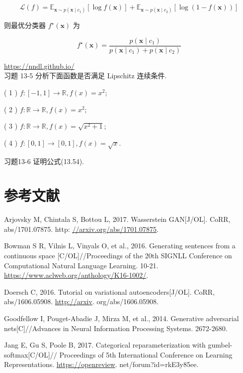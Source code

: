 \documentclass[10pt]{article}
\begin{document}
\begin{equation*}
\mathcal{L}(f)=\mathbb{E}_{\boldsymbol{x} \sim p\left(\boldsymbol{x} \mid c_{1}\right)}[\log f(\boldsymbol{x})]+\mathbb{E}_{\boldsymbol{x} \sim p\left(\boldsymbol{x} \mid c_{2}\right)}[\log (1-f(\boldsymbol{x}))] \tag{13.57}
\end{equation*}


则最优分类器 $f^{\star}(\boldsymbol{x})$ 为


\begin{equation*}
f^{\star}(\boldsymbol{x})=\frac{p\left(\boldsymbol{x} \mid c_{1}\right)}{p\left(\boldsymbol{x} \mid c_{1}\right)+p\left(\boldsymbol{x} \mid c_{2}\right)} \tag{13.58}
\end{equation*}


\href{https://nndl.github.io/}{https://nndl.github.io/}\\
习题 13-5 分析下面函数是否满足 Lipschitz 连续条件.

( 1 ) $f:[-1,1] \rightarrow \mathbb{R}, f(x)=x^{2}$;

( 2 ) $f: \mathbb{R} \rightarrow \mathbb{R}, f(x)=x^{2}$;

( 3 ) $f: \mathbb{R} \rightarrow \mathbb{R}, f(x)=\sqrt{x^{2}+1}$;

( 4 ) $f:[0,1] \rightarrow[0,1], f(x)=\sqrt{x}$.

习题13-6 证明公式(13.54).

\section*{参考文献}
Arjovsky M, Chintala S, Bottou L, 2017. Wasserstein GAN[J/OL]. CoRR, abs/1701.07875. http: \href{//arxiv.org/abs/1701.07875}{//arxiv.org/abs/1701.07875}.

Bowman S R, Vilnis L, Vinyals O, et al., 2016. Generating sentences from a continuous space [C/OL]//Proceedings of the 20th SIGNLL Conference on Computational Natural Language Learning. 10-21. \href{https://www.aclweb.org/anthology/K16-1002/}{https://www.aclweb.org/anthology/K16-1002/}.

Doersch C, 2016. Tutorial on variational autoencoders[J/OL]. CoRR, abs/1606.05908. \href{http://arxiv}{http://arxiv}. org/abs/1606.05908.

Goodfellow I, Pouget-Abadie J, Mirza M, et al., 2014. Generative adversarial nets[C]//Advances in Neural Information Processing Systems. 2672-2680.

Jang E, Gu S, Poole B, 2017. Categorical reparameterization with gumbel-softmax[C/OL]// Proceedings of 5th International Conference on Learning Representations. \href{https://openreview}{https://openreview}. net/forum?id=rkE3y85ee.
\end{document}
